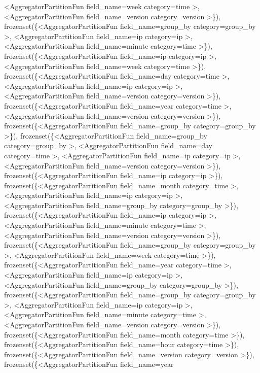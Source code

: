 \documentclass[letterpaper,10pt,english]{sphinxmanual}
\begin{document}
\begin{fulllineitems}
\begin{fulllineitems}
\textless{}AggregatorPartitionFun field\_name=week category=time \textgreater{}, \textless{}AggregatorPartitionFun field\_name=version category=version \textgreater{}\}), frozenset(\{\textless{}AggregatorPartitionFun field\_name=group\_by category=group\_by \textgreater{}, \textless{}AggregatorPartitionFun field\_name=ip category=ip \textgreater{}, \textless{}AggregatorPartitionFun field\_name=minute category=time \textgreater{}\}), frozenset(\{\textless{}AggregatorPartitionFun field\_name=ip category=ip \textgreater{}, \textless{}AggregatorPartitionFun field\_name=week category=time \textgreater{}\}), frozenset(\{\textless{}AggregatorPartitionFun field\_name=day category=time \textgreater{}, \textless{}AggregatorPartitionFun field\_name=ip category=ip \textgreater{}, \textless{}AggregatorPartitionFun field\_name=version category=version \textgreater{}\}), frozenset(\{\textless{}AggregatorPartitionFun field\_name=year category=time \textgreater{}, \textless{}AggregatorPartitionFun field\_name=version category=version \textgreater{}\}), frozenset(\{\textless{}AggregatorPartitionFun field\_name=group\_by category=group\_by \textgreater{}\}), frozenset(\{\textless{}AggregatorPartitionFun field\_name=group\_by category=group\_by \textgreater{}, \textless{}AggregatorPartitionFun field\_name=day category=time \textgreater{}, \textless{}AggregatorPartitionFun field\_name=ip category=ip \textgreater{}, \textless{}AggregatorPartitionFun field\_name=version category=version \textgreater{}\}), frozenset(\{\textless{}AggregatorPartitionFun field\_name=ip category=ip \textgreater{}\}), frozenset(\{\textless{}AggregatorPartitionFun field\_name=month category=time \textgreater{}, \textless{}AggregatorPartitionFun field\_name=ip category=ip \textgreater{}, \textless{}AggregatorPartitionFun field\_name=group\_by category=group\_by \textgreater{}\}), frozenset(\{\textless{}AggregatorPartitionFun field\_name=ip category=ip \textgreater{}, \textless{}AggregatorPartitionFun field\_name=minute category=time \textgreater{}, \textless{}AggregatorPartitionFun field\_name=version category=version \textgreater{}\}), frozenset(\{\textless{}AggregatorPartitionFun field\_name=group\_by category=group\_by \textgreater{}, \textless{}AggregatorPartitionFun field\_name=week category=time \textgreater{}\}), frozenset(\{\textless{}AggregatorPartitionFun field\_name=year category=time \textgreater{}, \textless{}AggregatorPartitionFun field\_name=ip category=ip \textgreater{}, \textless{}AggregatorPartitionFun field\_name=group\_by category=group\_by \textgreater{}\}), frozenset(\{\textless{}AggregatorPartitionFun field\_name=group\_by category=group\_by \textgreater{}, \textless{}AggregatorPartitionFun field\_name=ip category=ip \textgreater{}, \textless{}AggregatorPartitionFun field\_name=minute category=time \textgreater{}, \textless{}AggregatorPartitionFun field\_name=version category=version \textgreater{}\}), frozenset(\{\textless{}AggregatorPartitionFun field\_name=month category=time \textgreater{}\}), frozenset(\{\textless{}AggregatorPartitionFun field\_name=hour category=time \textgreater{}\}), frozenset(\{\textless{}AggregatorPartitionFun field\_name=version category=version \textgreater{}\}), frozenset(\{\textless{}AggregatorPartitionFun field\_name=year 
\end{fulllineitems}
\end{fulllineitems}
\end{document}
